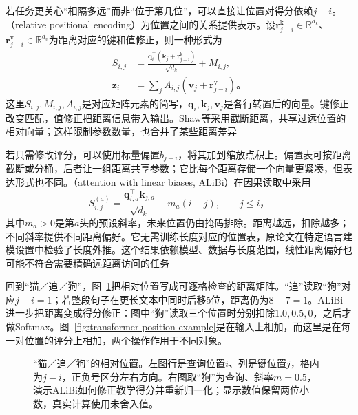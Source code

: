 若任务更关心“相隔多远”而非“位于第几位”，可以直接让位置对得分依赖$j-i$。（relative positional encoding）为位置之间的关系提供表示。设$\bm r_{j-i}^{\mathrm k}\in\mathbb R^{d_k}$、$\bm r_{j-i}^{\mathrm v}\in\mathbb R^{d_v}$为距离对应的键和值修正，则一种形式为
\begin{equation}
  \begin{aligned}
    S_{i,j}&=\frac{\bm q_i^{\top}(\bm k_j+\bm r_{j-i}^{\mathrm k})}
                        {\sqrt{d_k}}+M_{i,j},\\
    \bm z_i&=\sum_j A_{i,j}(\bm v_j+\bm r_{j-i}^{\mathrm v})\text{。}
  \end{aligned}
  \label{eq:transformer-relative-position}
\end{equation}
这里$S_{i,j},M_{i,j},A_{i,j}$是对应矩阵元素的简写，$\bm q_i,\bm k_j,\bm v_j$是各行转置后的向量。键修正改变匹配，值修正把距离信息带入输出。Shaw等采用截断距离，共享过远位置的相对向量；这样限制参数数量，也合并了某些距离差异

若只需修改评分，可以使用标量偏置$b_{j-i}$，将其加到缩放点积上。偏置表可按距离截断或分桶，后者让一组距离共享参数；它比每个距离存储一个向量更紧凑，但表达形式也不同。（attention with linear biases, ALiBi）在因果读取中采用
\begin{equation}
  S_{i,j}^{(a)}=\frac{\bm q_{i,a}^{\top}\bm k_{j,a}}{\sqrt{d_k}}
                 -m_a(i-j),\qquad j\leq i\text{，}
  \label{eq:transformer-alibi}
\end{equation}
其中$m_a>0$是第$a$头的预设斜率，未来位置仍由掩码排除。距离越远，扣除越多；不同斜率提供不同距离偏好。它无需训练长度对应的位置表，原论文在特定语言建模设置中检验了长度外推。这个结果依赖模型、数据与长度范围，线性距离偏好也可能不符合需要精确远距离访问的任务

回到“猫／追／狗”，图~\ref{fig:transformer-position-extensions}把相对位置写成可逐格检查的距离矩阵。“追”读取“狗”对应$j-i=1$；若整段句子在更长文本中同时后移5位，距离仍为$8-7=1$。ALiBi进一步把距离变成得分修正：图中“狗”读取三个位置时分别扣除$1.0,0.5,0$，之后才做Softmax。图~\ref{fig:transformer-position-example}是在输入上相加，而这里是在每一对位置的评分上相加，两个操作作用于不同对象。

\begin{figure}[htbp]
  \centering
  
  \caption{“猫／追／狗”的相对位置。左图行是查询位置$i$、列是键位置$j$，格内为$j-i$，正负号区分左右方向。右图取“狗”为查询、斜率$m=0.5$，演示ALiBi如何修正教学得分并重新归一化；显示数值保留两位小数，真实计算使用未舍入值。}
  \label{fig:transformer-position-extensions}
\end{figure}
\FloatBarrier

